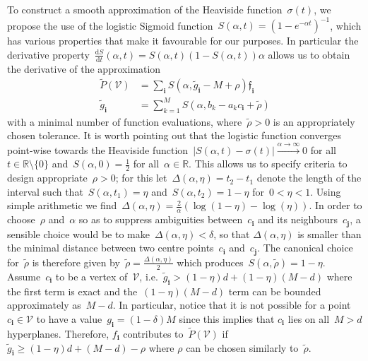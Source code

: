 \documentclass[letterpaper, 10pt, conference]{ieeeconf} %
\providecommand{\abs}[1]{\left\lvert#1\right\rvert}
\providecommand{\bfa}[1]{\mathbf{#1}}
\begin{document}
%
To construct a smooth approximation of the Heaviside function~$\sigma(t)$,
we propose the use of the logistic Sigmoid function~$S(\alpha,t) = (1-e^{-\alpha t})^{-1}$, which has various properties that make it favourable for our purposes.
%
In particular the derivative property~$\frac{\mathrm d S}{\mathrm d t}(\alpha,t)=S(\alpha,t)(1-S(\alpha,t))\alpha$ allows us to obtain the derivative of the approximation
%
\begin{equation}\label{eq:central:approximation:formula}
\begin{aligned}
\tilde{P}(\mathcal V) &= \sum_\bfa{i}S(\alpha,\tilde g_\bfa{i}-M+\rho)\mathfrak f_\bfa{i}\\
\tilde g_\bfa{i} &= \sum_{k=1}^M S(\alpha,b_k-a_k c_\bfa{i}+\tilde\rho)
\end{aligned}
\end{equation}
%
with a minimal number of function evaluations, where~$\tilde\rho>0$ is an appropriately chosen tolerance.
%
It is worth pointing out that the logistic function converges point-wise towards the Heaviside function~$\abs{S(\alpha,t)-\sigma(t)}\xrightarrow{\alpha\rightarrow\infty}0$ for all~$t\in\mathbb R\setminus\{0\}$ and~$S(\alpha,0)=\frac{1}{2}$ for all~$\alpha\in\mathbb R$.
%
This allows us to specify criteria to design appropriate~$\rho>0$; for this let~$\Delta(\alpha,\eta)=t_2-t_1$ denote the length of the interval such that~$S(\alpha,t_1)=\eta$ and~$S(\alpha,t_2)=1-\eta$ for~$0<\eta<1$.
%
Using simple arithmetic we find~$\Delta(\alpha,\eta)=\frac{2}{\alpha}(\log(1-\eta)-\log(\eta))$. In order to choose~$\rho$ and~$\alpha$ so as to suppress ambiguities between~$c_\bfa{i}$ and its neighbours~$c_\bfa{j}$, a sensible choice would be to make~$\Delta(\alpha,\eta)<\delta$, so that $\Delta(\alpha,\eta)$ is smaller than the minimal distance between two centre points~$c_\bfa{i}$ and~$c_\bfa{j}$. 
%
The canonical choice for~$\tilde\rho$ is therefore given by~$\tilde\rho=\frac{\Delta(\alpha,\eta)}{2}$ which produces~$S(\alpha,\tilde\rho)=1-\eta$.
%
Assume~$c_\bfa{i}$ to be a vertex of~$\mathcal V$, i.e.~$\tilde g_\bfa{i}>(1-\eta)d+(1-\eta)(M-d)$ where the first term is exact and the~$(1-\eta)(M-d)$ term can be bounded approximately as~$M-d$.
%
In particular, notice that it is not possible for a point~$c_\bfa{i}\in\mathcal V$ to have a value~$g_\bfa{i}=(1-\delta)M$ since this implies that $c_\bfa{i}$ lies on all~$M>d$ hyperplanes.
%
Therefore, $f_\bfa{i}$ contributes to~$\tilde{P}(\mathcal V)$ if~$\tilde g_\bfa{i}\geq(1-\eta)d+(M-d)-\rho$ where $\rho$ can be chosen similarly to~$\tilde\rho$.
\end{document}

